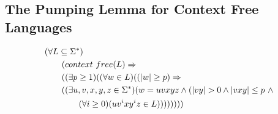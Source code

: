 \documentclass[../butidigress.tex]{subfiles}
\begin{document}
\subsection{The Pumping Lemma for Context Free Languages}
\begin{align*}
&(\forall L\subseteq \Sigma^{\ast}) \\
&\tab (context\ free(L) \Rightarrow \\
&\tab ((\exists p\geq 1)((\forall w\in L)((|w| \geq p) \Rightarrow \\
&\tab ((\exists u,v,x,y,z \in \Sigma^{\ast})(w=uvxyz \wedge (|vy| > 0 \wedge |vxy|\leq p\ \wedge \\
&\tab\tab (\forall i \geq 0)(uv^{i}xy^{i}z\in L))))))))
\end{align*}
\end{document}
